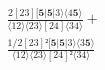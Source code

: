 \documentclass[varwidth, border=5pt]{standalone}
\begin{document}
\begin{my}
$\begin{gathered}
\scriptscriptstyle\frac{2[23][𝟓|𝟓|3⟩⟨4𝟓⟩}{⟨12⟩⟨23⟩[24]⟨34⟩} +\\
\scriptscriptstyle\frac{1/2[23]²[𝟓|𝟓|3⟩⟨3𝟓⟩}{⟨12⟩⟨23⟩[24]²⟨34⟩} \phantom{+}
\end{gathered}$
\end{my}
\end{document}
